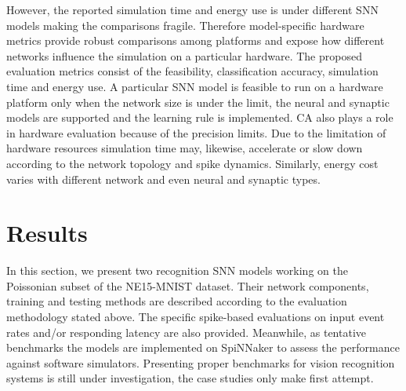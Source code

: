 \documentclass{frontiersENG} %
\begin{document}
However, the reported simulation time and energy use is under different SNN models making the comparisons fragile.
Therefore model-specific hardware metrics provide robust comparisons among platforms and expose how different networks influence the simulation on a particular hardware.
The proposed evaluation metrics consist of the feasibility, classification accuracy, simulation time and energy use.
A particular SNN model is feasible to run on a hardware platform only when the  network size is under the limit, the neural and synaptic models are supported and the learning rule is implemented.
CA also plays a role in hardware evaluation because of the precision limits.
Due to the limitation of hardware resources simulation time may, likewise, accelerate or slow down according to the network topology and spike dynamics.
Similarly, energy cost varies with different network and even neural and synaptic types.

\section{Results}
\label{sec:test}
In this section, we present two recognition SNN models working on the Poissonian subset of the NE15-MNIST dataset.
Their network components, training and testing methods are described according to the evaluation methodology stated above.
The specific spike-based evaluations on input event rates and/or responding latency are also provided. 
Meanwhile, as tentative benchmarks the models are implemented on SpiNNaker to assess the performance against software simulators.
Presenting proper benchmarks for vision recognition systems is still under investigation, the case studies only make first attempt.
\end{document}
